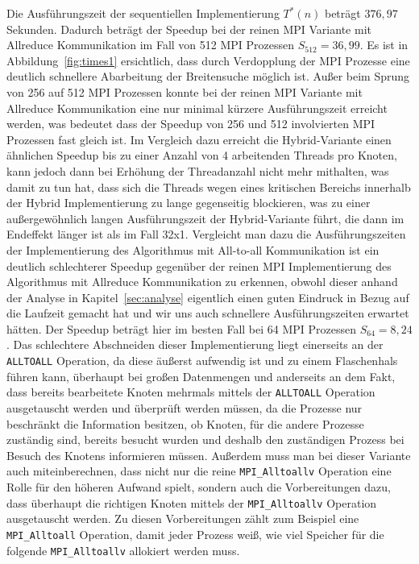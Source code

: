 \documentclass[11pt,a4paper]{article}
\begin{document}
Die Ausführungszeit der sequentiellen Implementierung \(T^{*}(n)\) beträgt \(376,97\) Sekunden. Dadurch beträgt der Speedup bei der reinen MPI Variante mit Allreduce Kommunikation im Fall von 512 MPI Prozessen \(S_{512} = 36,99\). Es ist in Abbildung~\ref{fig:times1} ersichtlich, dass durch Verdopplung der MPI Prozesse eine deutlich schnellere Abarbeitung der Breitensuche möglich ist. Außer beim Sprung von 256 auf 512 MPI Prozessen konnte bei der reinen MPI Variante mit Allreduce Kommunikation eine nur minimal kürzere Ausführungszeit erreicht werden, was bedeutet dass der Speedup von 256 und 512 involvierten MPI Prozessen fast gleich ist. Im Vergleich dazu erreicht die Hybrid-Variante einen ähnlichen Speedup bis zu einer Anzahl von 4 arbeitenden Threads pro Knoten, kann jedoch dann bei Erhöhung der Threadanzahl nicht mehr mithalten, was damit zu tun hat, dass sich die Threads wegen eines kritischen Bereichs innerhalb der Hybrid Implementierung zu lange gegenseitig blockieren, was zu einer außergewöhnlich langen Ausführungszeit der Hybrid-Variante führt, die dann im Endeffekt länger ist als im Fall 32x1. Vergleicht man dazu die Ausführungszeiten der Implementierung des Algorithmus mit All-to-all Kommunikation ist ein deutlich schlechterer Speedup gegenüber der reinen MPI Implementierung des Algorithmus mit Allreduce Kommunikation zu erkennen, obwohl dieser anhand der Analyse in Kapitel~\ref{sec:analyse} eigentlich einen guten Eindruck in Bezug auf die Laufzeit gemacht hat und wir uns auch schnellere Ausführungszeiten erwartet hätten. Der Speedup beträgt hier im besten Fall bei 64 MPI Prozessen \(S_{64} = 8,24\). Das schlechtere Abschneiden dieser Implementierung liegt einerseits an der \lstinline{ALLTOALL} Operation, da diese äußerst aufwendig ist und zu einem Flaschenhals führen kann, überhaupt bei großen Datenmengen und anderseits an dem Fakt, dass bereits bearbeitete Knoten mehrmals mittels der \lstinline{ALLTOALL} Operation ausgetauscht werden und überprüft werden müssen, da die Prozesse nur beschränkt die Information besitzen, ob Knoten, für die andere Prozesse zuständig sind, bereits besucht wurden und deshalb den zuständigen Prozess bei Besuch des Knotens informieren müssen. Außerdem muss man bei dieser Variante auch miteinberechnen, dass nicht nur die reine \lstinline{MPI_Alltoallv} Operation eine Rolle für den höheren Aufwand spielt, sondern auch die Vorbereitungen dazu, dass überhaupt die richtigen Knoten mittels der \lstinline{MPI_Alltoallv} Operation ausgetauscht werden. Zu diesen Vorbereitungen zählt zum Beispiel eine \lstinline{MPI_Alltoall} Operation, damit jeder Prozess weiß, wie viel Speicher für die folgende \lstinline{MPI_Alltoallv} allokiert werden muss.\\
\end{document}
